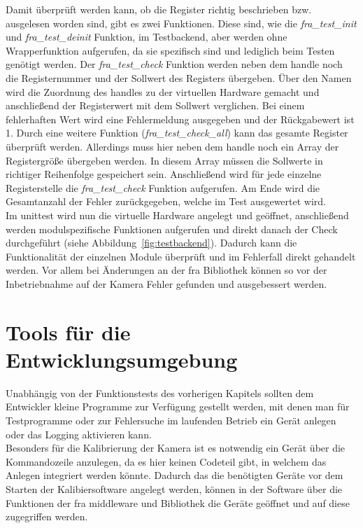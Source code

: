 Damit überprüft werden kann, ob die Register richtig beschrieben bzw. ausgelesen worden sind, gibt es zwei Funktionen. Diese sind, wie die \textit{fra\_test\_init} und \textit{fra\_test\_deinit} Funktion, im Testbackend, aber werden ohne Wrapperfunktion aufgerufen, da sie spezifisch sind und lediglich beim Testen genötigt werden.
Der \textit{fra\_test\_check} Funktion werden neben dem \gls{handle} noch die Registernummer und der Sollwert des Registers übergeben. Über den Namen wird die Zuordnung des \glspl{handle} zu der virtuellen Hardware gemacht und anschließend der Registerwert mit dem Sollwert verglichen. Bei einem fehlerhaften Wert wird eine Fehlermeldung ausgegeben und der Rückgabewert ist 1.
Durch eine weitere Funktion (\textit{fra\_test\_check\_all}) kann das gesamte Register überprüft werden. Allerdings muss hier neben dem \gls{handle} noch ein Array der Registergröße übergeben werden. In diesem Array müssen die Sollwerte in richtiger Reihenfolge gespeichert sein. Anschließend wird für jede einzelne Registerstelle die \textit{fra\_test\_check} Funktion aufgerufen. Am Ende wird die Gesamtanzahl der Fehler zurückgegeben, welche im Test ausgewertet wird.\\


Im \gls{unittest} wird nun die virtuelle Hardware angelegt und geöffnet, anschließend werden modulspezifische Funktionen aufgerufen und direkt danach der Check durchgeführt (siehe Abbildung~\ref{fig:testbackend}). Dadurch kann die Funktionalität der einzelnen Module überprüft und im Fehlerfall direkt gehandelt werden. Vor allem bei Änderungen an der \ac{fra} Bibliothek können so vor der Inbetriebnahme auf der Kamera Fehler gefunden und ausgebessert werden.


\section{Tools für die Entwicklungsumgebung}
Unabhängig von der Funktionstests des vorherigen Kapitels sollten dem Entwickler kleine Programme zur Verfügung gestellt werden, mit denen man für Testprogramme oder zur Fehlersuche im laufenden Betrieb ein Gerät anlegen oder das Logging aktivieren kann.\\


Besonders für die Kalibrierung der Kamera ist es notwendig ein Gerät über die Kommandozeile anzulegen, da es hier keinen Codeteil gibt, in welchem das Anlegen integriert werden könnte. Dadurch das die benötigten Geräte vor dem Starten der Kalibiersoftware angelegt werden, können in der Software über die Funktionen der \ac{fra} \gls{middleware} und Bibliothek die Geräte geöffnet und auf diese zugegriffen werden.


